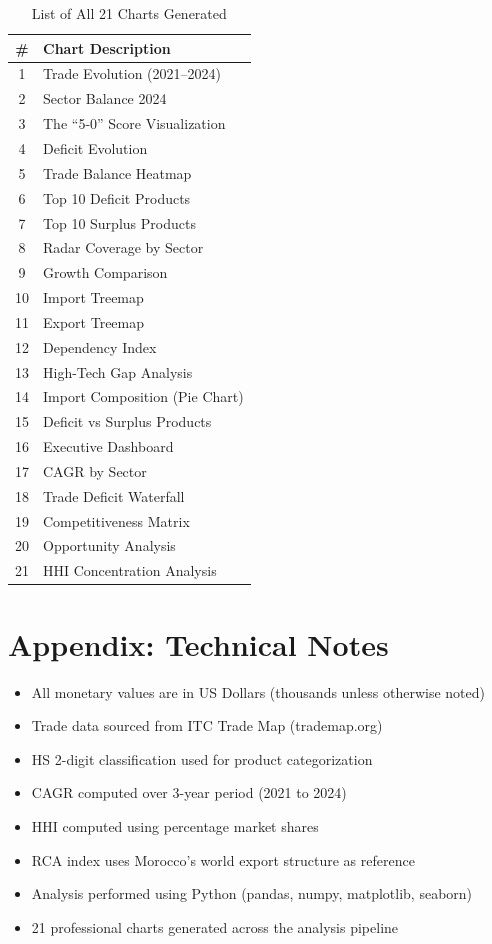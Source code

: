 \documentclass[12pt,a4paper]{article}
\begin{document}
\begin{table}[H]
\centering
\caption{List of All 21 Charts Generated}
\begin{tabular}{c l}
\toprule
\textbf{\#} & \textbf{Chart Description} \\
\midrule
1 & Trade Evolution (2021--2024) \\
2 & Sector Balance 2024 \\
3 & The ``5-0'' Score Visualization \\
4 & Deficit Evolution \\
5 & Trade Balance Heatmap \\
6 & Top 10 Deficit Products \\
7 & Top 10 Surplus Products \\
8 & Radar Coverage by Sector \\
9 & Growth Comparison \\
10 & Import Treemap \\
11 & Export Treemap \\
12 & Dependency Index \\
13 & High-Tech Gap Analysis \\
14 & Import Composition (Pie Chart) \\
15 & Deficit vs Surplus Products \\
16 & Executive Dashboard \\
17 & CAGR by Sector \\
18 & Trade Deficit Waterfall \\
19 & Competitiveness Matrix \\
20 & Opportunity Analysis \\
21 & HHI Concentration Analysis \\
\bottomrule
\end{tabular}
\end{table}

\section{Appendix: Technical Notes}

\begin{itemize}
\item All monetary values are in US Dollars (thousands unless otherwise noted)
\item Trade data sourced from ITC Trade Map (trademap.org)
\item HS 2-digit classification used for product categorization
\item CAGR computed over 3-year period (2021 to 2024)
\item HHI computed using percentage market shares
\item RCA index uses Morocco's world export structure as reference
\item Analysis performed using Python (pandas, numpy, matplotlib, seaborn)
\item 21 professional charts generated across the analysis pipeline
\end{itemize}
\end{document}
